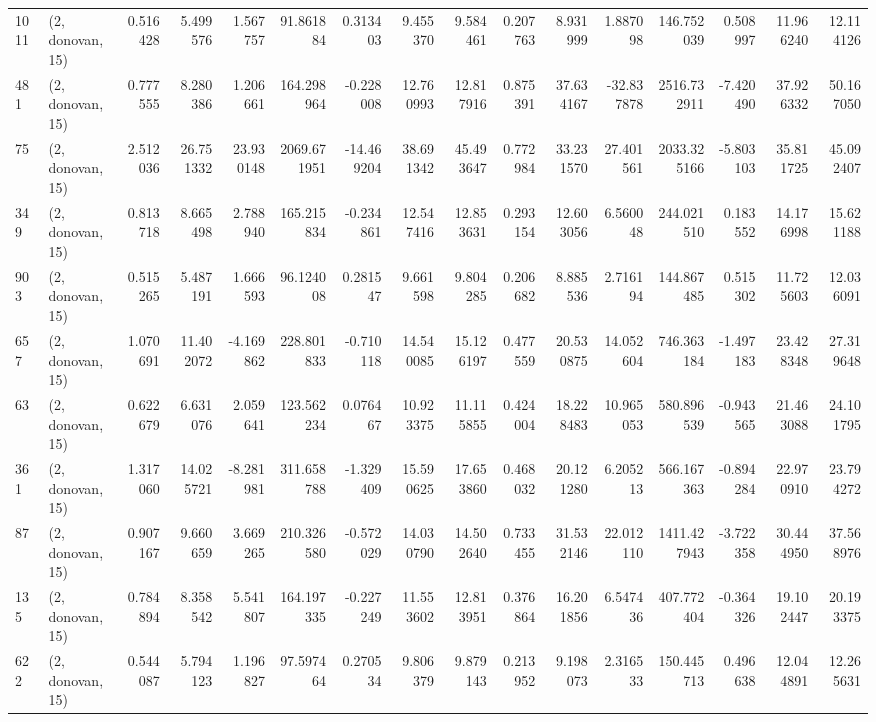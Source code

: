 \begin{tabular}{llrrrrrrrrrrrrrr}
1011 &  (2, donovan, 15) &   0.516428 &   5.499576 &   1.567757 &     91.861884 &    0.313403 &    9.455370 &    9.584461 &  0.207763 &   8.931999 &   1.887098 &   146.752039 &   0.508997 &  11.966240 &  12.114126 \\
481  &  (2, donovan, 15) &   0.777555 &   8.280386 &   1.206661 &    164.298964 &   -0.228008 &   12.760993 &   12.817916 &  0.875391 &  37.634167 & -32.837878 &  2516.732911 &  -7.420490 &  37.926332 &  50.167050 \\
75   &  (2, donovan, 15) &   2.512036 &  26.751332 &  23.930148 &   2069.671951 &  -14.469204 &   38.691342 &   45.493647 &  0.772984 &  33.231570 &  27.401561 &  2033.325166 &  -5.803103 &  35.811725 &  45.092407 \\
349  &  (2, donovan, 15) &   0.813718 &   8.665498 &   2.788940 &    165.215834 &   -0.234861 &   12.547416 &   12.853631 &  0.293154 &  12.603056 &   6.560048 &   244.021510 &   0.183552 &  14.176998 &  15.621188 \\
903  &  (2, donovan, 15) &   0.515265 &   5.487191 &   1.666593 &     96.124008 &    0.281547 &    9.661598 &    9.804285 &  0.206682 &   8.885536 &   2.716194 &   144.867485 &   0.515302 &  11.725603 &  12.036091 \\
657  &  (2, donovan, 15) &   1.070691 &  11.402072 &  -4.169862 &    228.801833 &   -0.710118 &   14.540085 &   15.126197 &  0.477559 &  20.530875 &  14.052604 &   746.363184 &  -1.497183 &  23.428348 &  27.319648 \\
63   &  (2, donovan, 15) &   0.622679 &   6.631076 &   2.059641 &    123.562234 &    0.076467 &   10.923375 &   11.115855 &  0.424004 &  18.228483 &  10.965053 &   580.896539 &  -0.943565 &  21.463088 &  24.101795 \\
361  &  (2, donovan, 15) &   1.317060 &  14.025721 &  -8.281981 &    311.658788 &   -1.329409 &   15.590625 &   17.653860 &  0.468032 &  20.121280 &   6.205213 &   566.167363 &  -0.894284 &  22.970910 &  23.794272 \\
87   &  (2, donovan, 15) &   0.907167 &   9.660659 &   3.669265 &    210.326580 &   -0.572029 &   14.030790 &   14.502640 &  0.733455 &  31.532146 &  22.012110 &  1411.427943 &  -3.722358 &  30.444950 &  37.568976 \\
135  &  (2, donovan, 15) &   0.784894 &   8.358542 &   5.541807 &    164.197335 &   -0.227249 &   11.553602 &   12.813951 &  0.376864 &  16.201856 &   6.547436 &   407.772404 &  -0.364326 &  19.102447 &  20.193375 \\
622  &  (2, donovan, 15) &   0.544087 &   5.794123 &   1.196827 &     97.597464 &    0.270534 &    9.806379 &    9.879143 &  0.213952 &   9.198073 &   2.316533 &   150.445713 &   0.496638 &  12.044891 &  12.265631 \\

\end{tabular}
